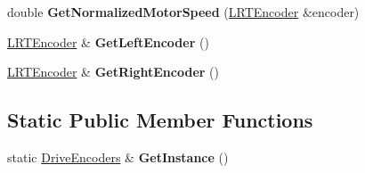 \begin{DoxyCompactItemize}
\item 
\hypertarget{class_drive_encoders_a042a36bcaa043686ab8fbe50dc17d6cf}{
double {\bfseries \-Get\-Normalized\-Motor\-Speed} (\hyperlink{class_l_r_t_encoder}{\-L\-R\-T\-Encoder} \&encoder)}
\label{class_drive_encoders_a042a36bcaa043686ab8fbe50dc17d6cf}

\item 
\hypertarget{class_drive_encoders_a2278853105e0ff1707a45c3919be9e70}{
\hyperlink{class_l_r_t_encoder}{\-L\-R\-T\-Encoder} \& {\bfseries \-Get\-Left\-Encoder} ()}
\label{class_drive_encoders_a2278853105e0ff1707a45c3919be9e70}

\item 
\hypertarget{class_drive_encoders_a2f2d4e647cb31e662f6ff8721d25e933}{
\hyperlink{class_l_r_t_encoder}{\-L\-R\-T\-Encoder} \& {\bfseries \-Get\-Right\-Encoder} ()}
\label{class_drive_encoders_a2f2d4e647cb31e662f6ff8721d25e933}

\end{DoxyCompactItemize}
\subsection*{\-Static \-Public \-Member \-Functions}
\begin{DoxyCompactItemize}
\item 
\hypertarget{class_drive_encoders_afe575bcc156662c627e013ea048478c8}{
static \hyperlink{class_drive_encoders}{\-Drive\-Encoders} \& {\bfseries \-Get\-Instance} ()}
\label{class_drive_encoders_afe575bcc156662c627e013ea048478c8}

\end{DoxyCompactItemize}
